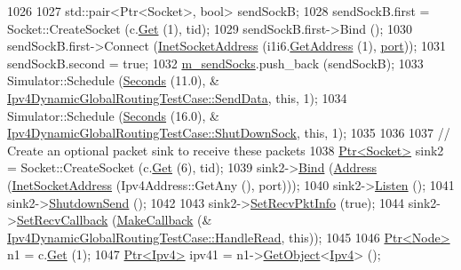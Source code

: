 \begin{DoxyCode}
1026 
1027   std::pair<Ptr<Socket>, \textcolor{keywordtype}{bool}>  sendSockB;
1028   sendSockB.first = Socket::CreateSocket (c.\hyperlink{classns3_1_1NodeContainer_a9ed96e2ecc22e0f5a3d4842eb9bf90bf}{Get} (1), tid);
1029   sendSockB.first->Bind ();
1030   sendSockB.first->Connect (\hyperlink{classns3_1_1InetSocketAddress}{InetSocketAddress} (i1i6.\hyperlink{classns3_1_1Ipv4InterfaceContainer_ae63208dcd222be986822937ee4aa828c}{GetAddress} (1), 
      \hyperlink{dsdv-manet_8cc_a8e0798404bf2cf5dabb84c5ba9a4f236}{port}));
1031   sendSockB.second = \textcolor{keyword}{true};
1032   \hyperlink{classIpv4DynamicGlobalRoutingTestCase_ab5c3600b2f8c2e1fa3b91977e7d4a3d0}{m\_sendSocks}.push\_back (sendSockB);
1033   Simulator::Schedule (\hyperlink{group__timecivil_ga33c34b816f8ff6628e33d5c8e9713b9e}{Seconds} (11.0), &
      \hyperlink{classIpv4DynamicGlobalRoutingTestCase_ae9f0be02edbbc7b33856d1b89b1881e2}{Ipv4DynamicGlobalRoutingTestCase::SendData}, \textcolor{keyword}{this}, 1);
1034   Simulator::Schedule (\hyperlink{group__timecivil_ga33c34b816f8ff6628e33d5c8e9713b9e}{Seconds} (16.0), &
      \hyperlink{classIpv4DynamicGlobalRoutingTestCase_ae7148ddfaf88bcc3694de3d2271b727d}{Ipv4DynamicGlobalRoutingTestCase::ShutDownSock}, \textcolor{keyword}{this}, 1);
1035 
1036 
1037   \textcolor{comment}{// Create an optional packet sink to receive these packets}
1038   \hyperlink{classns3_1_1Ptr}{Ptr<Socket>} sink2 = Socket::CreateSocket (c.\hyperlink{classns3_1_1NodeContainer_a9ed96e2ecc22e0f5a3d4842eb9bf90bf}{Get} (6), tid);
1039   sink2->\hyperlink{classns3_1_1Socket_ada93439a43de2028b5a8fc6621dad482}{Bind} (\hyperlink{classns3_1_1Address}{Address} (\hyperlink{classns3_1_1InetSocketAddress}{InetSocketAddress} (Ipv4Address::GetAny (), port)));
1040   sink2->\hyperlink{classns3_1_1Socket_a6b3529a32632cf1a56debf5f79e56c54}{Listen} ();
1041   sink2->\hyperlink{classns3_1_1Socket_a8186c87627fa3ece326d8f1c822d7f95}{ShutdownSend} ();
1042 
1043   sink2->\hyperlink{classns3_1_1Socket_a340563e2858d7375ab0aa160a9557fff}{SetRecvPktInfo} (\textcolor{keyword}{true});
1044   sink2->\hyperlink{classns3_1_1Socket_a243f7835ef1a85f9270fd3577e3a40da}{SetRecvCallback} (\hyperlink{group__makecallbackmemptr_ga9376283685aa99d204048d6a4b7610a4}{MakeCallback} (&
      \hyperlink{classIpv4DynamicGlobalRoutingTestCase_a8649588426821efe9b55de7883538be7}{Ipv4DynamicGlobalRoutingTestCase::HandleRead}, \textcolor{keyword}{this}));
1045 
1046   \hyperlink{classns3_1_1Ptr}{Ptr<Node>} n1 = c.\hyperlink{classns3_1_1NodeContainer_a9ed96e2ecc22e0f5a3d4842eb9bf90bf}{Get} (1);
1047   \hyperlink{classns3_1_1Ptr}{Ptr<Ipv4>} ipv41 = n1->\hyperlink{classns3_1_1Object_a13e18c00017096c8381eb651d5bd0783}{GetObject}<\hyperlink{classns3_1_1Ipv4}{Ipv4}> ();

\end{DoxyCode}
